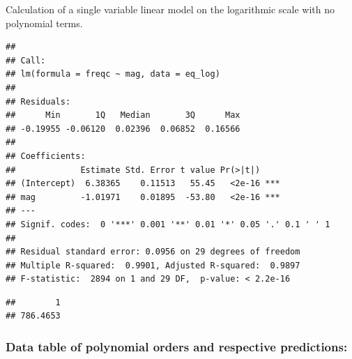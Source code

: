 Calculation of a single variable linear model on the logarithmic scale
with no polynomial terms.

\begin{Shaded}
\begin{Highlighting}[]
\OtherTok{\textless{}{-}} \NormalTok{(}\SpecialCharTok{\textasciitilde{}}


\end{Highlighting}
\end{Shaded}

\begin{verbatim}
## 
## Call:
## lm(formula = freqc ~ mag, data = eq_log)
## 
## Residuals:
##      Min       1Q   Median       3Q      Max 
## -0.19955 -0.06120  0.02396  0.06852  0.16566 
## 
## Coefficients:
##             Estimate Std. Error t value Pr(>|t|)    
## (Intercept)  6.38365    0.11513   55.45   <2e-16 ***
## mag         -1.01971    0.01895  -53.80   <2e-16 ***
## ---
## Signif. codes:  0 '***' 0.001 '**' 0.01 '*' 0.05 '.' 0.1 ' ' 1
## 
## Residual standard error: 0.0956 on 29 degrees of freedom
## Multiple R-squared:  0.9901, Adjusted R-squared:  0.9897 
## F-statistic:  2894 on 1 and 29 DF,  p-value: < 2.2e-16
\end{verbatim}

\begin{Shaded}
\begin{Highlighting}[]
\OtherTok{\textless{}{-}}  \NormalTok{(} \NormalTok{))}
\SpecialCharTok{/}\SpecialCharTok{\^{}}
\end{Highlighting}
\end{Shaded}

\begin{verbatim}
##        1 
## 786.4653
\end{verbatim}

\hypertarget{data-table-of-polynomial-orders-and-respective-predictions}{%
\subsubsection{Data table of polynomial orders and respective
predictions:}\label{data-table-of-polynomial-orders-and-respective-predictions}}

